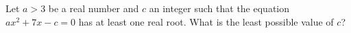 Let $a>3$ be a real number and $c$ an integer such that the equation $ax^2+7x-c=0$ has at least one real root. What is the least possible value of $c$?
